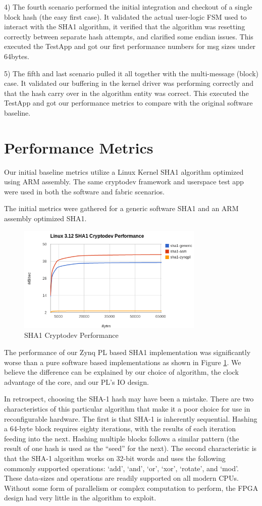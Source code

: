 \documentclass[journal]{IEEEtran}
\begin{document}
4) The fourth scenario performed the initial integration and checkout of a single block hash (the easy first case).  It validated the actual user-logic FSM used to interact with the SHA1 algorithm, it verified that the algorithm was resetting correctly between separate hash attempts, and clarified some endian issues.  This executed the TestApp and got our first performance numbers for msg sizes under 64bytes.

5) The fifth and last scenario pulled it all together with the multi-message (block) case.  It validated our buffering in the kernel driver was performing correctly and that the hash carry over in the algorithm entity was correct.   This executed the TestApp and got our performance metrics to compare with the original software baseline.

\section{Performance Metrics}
Our initial baseline metrics utilize a Linux Kernel SHA1 algorithm optimized using ARM assembly.  The same cryptodev framework and userspace test app were used in both the software and fabric scenarios.

The initial metrics were gathered for a generic software SHA1 and an ARM assembly optimized SHA1. 
\begin{figure}[ht]
\centering
\includegraphics[width=3.5in]{perf.png}
\caption{SHA1 Cryptodev Performance}
\label{fig_algoPerf}
\end{figure} 
The performance of our Zynq PL based SHA1 implementation was significantly worse than a pure software based implementations as shown in Figure \ref{fig_algoPerf}. We believe the difference can be explained by our choice of algorithm, the clock advantage of the core, and our PL’s IO design. 

In retrospect, choosing the SHA-1 hash may have been a mistake.  There are two characteristics of this particular algorithm that make it a poor choice for use in reconfigurable hardware.  The first is that SHA-1 is inherently sequential.  Hashing a 64-byte block requires eighty iterations, with the results of each iteration feeding into the next.  Hashing multiple blocks follows a similar pattern (the result of one hash is used as the “seed” for the next).  The second characteristic is that the SHA-1 algorithm works on 32-bit words and uses the following commonly supported operations: ‘add’, ‘and’, ‘or’, ‘xor’, ‘rotate’, and ‘mod’. These data-sizes and operations are readily supported on all modern CPUs.  Without some form of parallelism or complex computation to perform, the FPGA design had very little in the algorithm to exploit.
\end{document}
